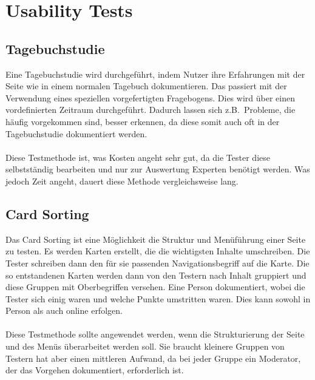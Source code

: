 \section{Usability Tests}\label{sec:usability-tests}

\subsection{Tagebuchstudie}\label{subsec:tagebuchstudie}
Eine Tagebuchstudie wird durchgeführt, indem Nutzer ihre Erfahrungen mit der Seite wie in einem normalen Tagebuch dokumentieren.
Das passiert mit der Verwendung eines speziellen vorgefertigten Fragebogens.
Dies wird über einen vordefinierten Zeitraum durchgeführt.
Dadurch lassen sich z.B.\ Probleme, die häufig vorgekommen sind, besser erkennen, da diese somit auch oft in der Tagebuchstudie dokumentiert werden.\\\\
Diese Testmethode ist, was Kosten angeht sehr gut, da die Tester diese selbstständig bearbeiten und nur zur Auswertung Experten benötigt werden.
Was jedoch Zeit angeht, dauert diese Methode vergleichsweise lang.\autocite[vgl.~][]{usability.de.tagebuch}

\subsection{Card Sorting}\label{subsec:card-sorting}
Das Card Sorting ist eine Möglichkeit die Struktur und Menüführung einer Seite zu testen.
Es werden Karten erstellt, die die wichtigsten Inhalte umschreiben.
Die Tester schreiben dann den für sie passenden Navigationsbegriff auf die Karte.
Die so entstandenen Karten werden dann von den Testern nach Inhalt gruppiert und diese Gruppen mit Oberbegriffen versehen.
Eine Person dokumentiert, wobei die Tester sich einig waren und welche Punkte umstritten waren.
Dies kann sowohl in Person als auch online erfolgen.\\\\
Diese Testmethode sollte angewendet werden, wenn die Strukturierung der Seite und des Menüs überarbeitet werden soll.
Sie braucht kleinere Gruppen von Testern hat aber einen mittleren Aufwand, da bei jeder Gruppe ein Moderator, der das Vorgehen dokumentiert, erforderlich ist.\autocite[vgl.~][]{usability.de.cardsorting}

